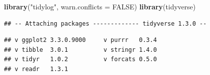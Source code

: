 \documentclass[
]{book}
\newenvironment{Shaded}{\begin{snugshade}}{\end{snugshade}}
\newcommand{\DataTypeTok}[1]{\textcolor[rgb]{0.13,0.29,0.53}{#1}}
\newcommand{\KeywordTok}[1]{\textcolor[rgb]{0.13,0.29,0.53}{\textbf{#1}}}
\newcommand{\NormalTok}[1]{#1}
\newcommand{\OtherTok}[1]{\textcolor[rgb]{0.56,0.35,0.01}{#1}}
\newcommand{\StringTok}[1]{\textcolor[rgb]{0.31,0.60,0.02}{#1}}
\begin{document}
\begin{Shaded}
\begin{Highlighting}[]
\KeywordTok{library}\NormalTok{(}\StringTok{"tidylog"}\NormalTok{, }\DataTypeTok{warn.conflicts =} \OtherTok{FALSE}\NormalTok{)}
\KeywordTok{library}\NormalTok{(tidyverse)}
\end{Highlighting}
\end{Shaded}

\begin{verbatim}
## -- Attaching packages ------------- tidyverse 1.3.0 --
\end{verbatim}

\begin{verbatim}
## v ggplot2 3.3.0.9000     v purrr   0.3.4     
## v tibble  3.0.1          v stringr 1.4.0     
## v tidyr   1.0.2          v forcats 0.5.0     
## v readr   1.3.1
\end{verbatim}
\end{document}
